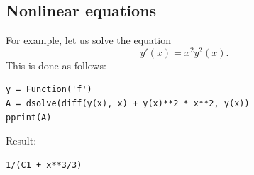 \documentclass[article,A4,12pt]{llncs}
\begin{document}



\subsection{Nonlinear equations}

For example, let us solve the equation 
$$
  y'(x) = x^2 y^2(x).
$$
This is done as follows:
\begin{verbatim}
y = Function('f')
A = dsolve(diff(y(x), x) + y(x)**2 * x**2, y(x))
pprint(A)
\end{verbatim}
Result:
\begin{verbatim}
1/(C1 + x**3/3)
\end{verbatim}

\end{document}
